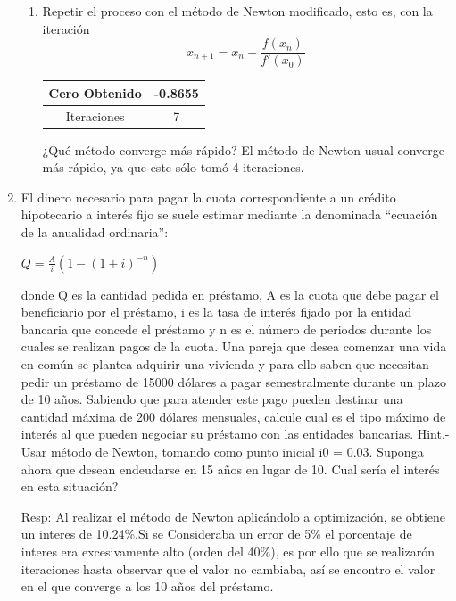 \documentclass{udpreport}
\begin{document}
\begin{enumerate}
\begin{enumerate}
        \item Repetir el proceso con el método de Newton modificado, esto es, con la iteración $$x_{n+1} = x_{n} - \frac {f(x_{n})} {f'(x_{0})} $$
        \begin{table}[H]
        \centering
        \begin{tabular} { |c|c|}
        
        \hline
        Cero Obtenido &  -0.8655\\
        \hline
        Iteraciones   &    7\\
        \hline
        
        \end{tabular}
        \end{table}
        ¿Qué método converge más rápido?
        El método de Newton usual converge más rápido, ya que este sólo tomó 4 iteraciones. %
    \end{enumerate}

\newpage
\item El dinero necesario para pagar la cuota correspondiente a un crédito hipotecario a interés fijo se suele
estimar mediante la denominada “ecuación de la anualidad ordinaria”:
\begin{center}
    $ Q = \frac{A}{i}(1-(1+i)^{-n}) $
\end{center}
donde Q es la cantidad pedida en préstamo, A es la cuota que debe pagar el beneficiario por el
préstamo, i es la tasa de interés fijado por la entidad bancaria que concede el préstamo y n es el
número de periodos durante los cuales se realizan pagos de la cuota.
Una pareja que desea comenzar una vida en común se plantea adquirir una vivienda y para ello saben
que necesitan pedir un préstamo de 15000 dólares a pagar semestralmente durante un plazo de 10 años.
Sabiendo que para atender este pago pueden destinar una cantidad máxima de 200 dólares mensuales,
calcule cual es el tipo máximo de interés al que pueden negociar su préstamo con las entidades bancarias.
Hint.- Usar método de Newton, tomando como punto inicial i0 = 0.03.
Suponga ahora que desean endeudarse en 15 años en lugar de 10. Cual sería el interés en esta situación?


Resp: Al realizar el método de Newton aplicándolo a optimización, se obtiene un interes de 10.24\%.Si se Consideraba un error de 5\% el porcentaje de interes era excesivamente alto (orden del 40\%), es por ello que se realizarón iteraciones hasta observar que el valor no cambiaba, así se encontro el valor en el que converge a los 10 años del préstamo.


\end{enumerate}
\end{document}
